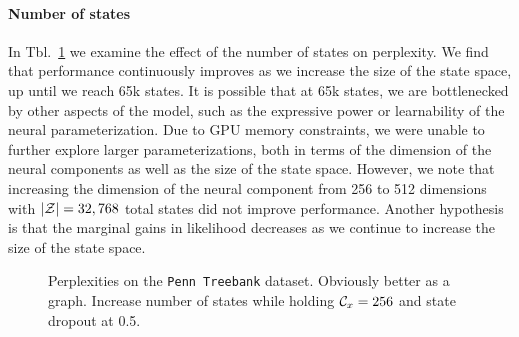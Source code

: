 \documentclass[11pt,a4paper]{article}
\begin{document}
\paragraph{Number of states}
In Tbl.~\ref{tbl:states-ablation} we examine the effect of the 
number of states on perplexity.
We find that performance continuously improves as we increase
the size of the state space, up until we reach 65k states.
It is possible that at 65k states, we are bottlenecked by
other aspects of the model, such as the expressive power
or learnability of the neural parameterization. 
Due to GPU memory constraints, we were unable to further
explore larger parameterizations, both 
in terms of the dimension of the neural components as well as 
the size of the state space.
However, we note that increasing the dimension of the neural component from 256 to
512 dimensions with $|\mathcal{Z}| = 32,768$ total states did not improve performance.
Another hypothesis is that the marginal gains in likelihood
decreases as we continue to increase the size of the state space.

\begin{comment}
\begin{table}[!t]
\centering
\begin{tabular}{ll}
\toprule
$|\mcZ|$ & Val PPL\\
\midrule
1024 & 213.25\\
2048 & 199.98\\
4096 & 169.18\\
8192 & 150.22\\
16384 & 135.79\\
32768 & 125.02\\
65536 & 121.93\\
\bottomrule
\end{tabular}
\caption{\label{tbl:states-ablation}
Perplexities on the \texttt{Penn Treebank} dataset.
Obviously better as a graph.
Increase number of states while holding $\mcC_x=256$
and state dropout at 0.5.
}
\end{table}
\end{comment}

\begin{figure}[!t]
\centering
{}
\caption{\label{tbl:states-ablation}
Perplexities on the \texttt{Penn Treebank} dataset.
Obviously better as a graph.
Increase number of states while holding $\mathcal{C}_x=256$
and state dropout at 0.5.
}
\end{figure}
\end{document}
